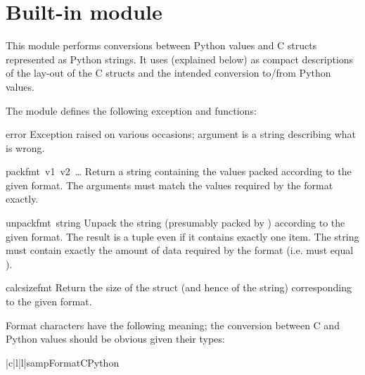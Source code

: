 \section{Built-in module }

This module performs conversions between Python values and C
structs represented as Python strings.  It uses 
(explained below) as compact descriptions of the lay-out of the C
structs and the intended conversion to/from Python values.

The module defines the following exception and functions:

\renewcommand{\indexsubitem}{(in module struct)}
\begin{excdesc}{error}
  Exception raised on various occasions; argument is a string
  describing what is wrong.
\end{excdesc}

\begin{funcdesc}{pack}{fmt\, v1\, v2\, {\rm \ldots}}
  Return a string containing the values
   packed according to the given
  format.  The arguments must match the values required by the format
  exactly.
\end{funcdesc}

\begin{funcdesc}{unpack}{fmt\, string}
  Unpack the string (presumably packed by )
  according to the given format.  The result is a tuple even if it
  contains exactly one item.  The string must contain exactly the
  amount of data required by the format (i.e.   must
  equal ).
\end{funcdesc}

\begin{funcdesc}{calcsize}{fmt}
  Return the size of the struct (and hence of the string)
  corresponding to the given format.
\end{funcdesc}

Format characters have the following meaning; the conversion between C
and Python values should be obvious given their types:

\begin{tableiii}{|c|l|l|}{samp}{Format}{C}{Python}
\end{tableiii}

